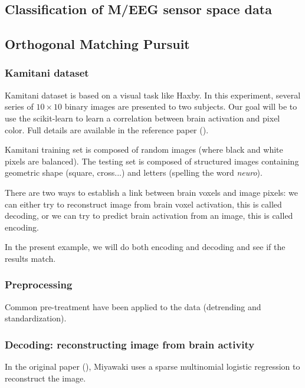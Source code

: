 \documentclass{frontiersSCNS} %
\begin{document}
\subsection{Classification of M/EEG sensor space data}


\subsection{Orthogonal Matching Pursuit}

\subsubsection{Kamitani dataset}

Kamitani dataset is based on a visual task like Haxby. In this experiment,
several series of $10\times10$ binary images are presented to two subjects.
Our goal will be to use the scikit-learn to learn a correlation between brain
activation and pixel color. Full details are available in the reference paper
(\cite{miyawaki2008}).

Kamitani training set is composed of random images (where black and white pixels
are balanced). The testing set is composed of structured images containing
geometric shape (square, cross...) and letters (spelling the word \emph{neuro}).

There are two ways to establish a link between brain voxels and image pixels: we
can either try to reconstruct image from brain voxel activation, this is called
decoding, or we can try to predict brain activation from an image, this is called
encoding.

In the present example, we will do both encoding and decoding and see if the
results match.

\subsubsection{Preprocessing}

Common pre-treatment have been applied to the data (detrending and
standardization).

\subsubsection{Decoding: reconstructing image from brain activity}

In the original paper (\cite{miyawaki2008}), Miyawaki uses a sparse multinomial
logistic regression to reconstruct the image.
\end{document}
